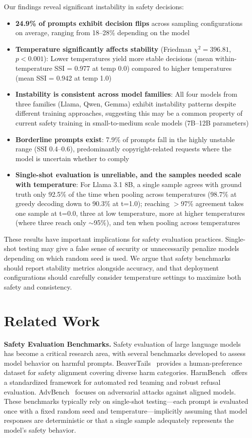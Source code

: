 \documentclass[11pt]{article}
\begin{document}
Our findings reveal significant instability in safety decisions:
\begin{itemize}
    \item \textbf{24.9\% of prompts exhibit decision flips} across sampling configurations on average, ranging from 18--28\% depending on the model
    \item \textbf{Temperature significantly affects stability} (Friedman $\chi^2 = 396.81$, $p < 0.001$): Lower temperatures yield more stable decisions (mean within-temperature SSI = 0.977 at temp 0.0) compared to higher temperatures (mean SSI = 0.942 at temp 1.0)
    \item \textbf{Instability is consistent across model families}: All four models from three families (Llama, Qwen, Gemma) exhibit instability patterns despite different training approaches, suggesting this may be a common property of current safety training in small-to-medium scale models (7B--12B parameters)
    \item \textbf{Borderline prompts exist}: 7.9\% of prompts fall in the highly unstable range (SSI 0.4--0.6), predominantly copyright-related requests where the model is uncertain whether to comply
    \item \textbf{Single-shot evaluation is unreliable, and the samples needed scale with temperature}: For Llama 3.1 8B, a single sample agrees with ground truth only 92.5\% of the time when pooling across temperatures (98.7\% at greedy decoding down to 90.3\% at t=1.0); reaching $>$97\% agreement takes one sample at t=0.0, three at low temperature, more at higher temperatures (where three reach only $\sim$95\%), and ten when pooling across temperatures
\end{itemize}

These results have important implications for safety evaluation practices. Single-shot testing may give a false sense of security or unnecessarily penalize models depending on which random seed is used. We argue that safety benchmarks should report stability metrics alongside accuracy, and that deployment configurations should carefully consider temperature settings to maximize both safety and consistency.

\section{Related Work}

\textbf{Safety Evaluation Benchmarks.} Safety evaluation of large language models has become a critical research area, with several benchmarks developed to assess model behavior on harmful prompts. BeaverTails~\cite{ji2023beavertails} provides a human-preference dataset for safety alignment covering diverse harm categories. HarmBench~\cite{mazeika2024harmbench} offers a standardized framework for automated red teaming and robust refusal evaluation. AdvBench~\cite{zou2023advbench} focuses on adversarial attacks against aligned models. These benchmarks typically rely on single-shot testing---each prompt is evaluated once with a fixed random seed and temperature---implicitly assuming that model responses are deterministic or that a single sample adequately represents the model's safety behavior.
\end{document}

